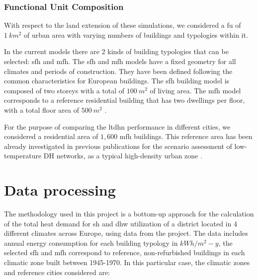 \documentclass{article}
\begin{document}
\subsubsection{Functional Unit Composition}

With respect to the land extension of these simulations, we considered a \gls{fu} of $1\ km^2$ of urban area with varying numbers of buildings and typologies within it. 

In the current models there are 2 kinds of building typologies that can be selected: \gls{sfh} and \gls{mfh}. The \gls{sfh} and \gls{mfh} models have a fixed geometry for all climates and periods of construction. They have been defined following the common characteristics for European buildings. The \gls{sfh} building model is composed of two storeys with a total of $100\ m^2$ of living area. The \gls{mfh} model corresponds to a reference residential building that has two dwellings per floor, with a total floor area of $500\ m^2$ \cite{dipasquale_chiara_2019_3256270}.

For the purpose of comparing the \gls{ltdhn} performance in different cities, we considered a residential area of $1,600$ \gls{mfh} buildings. This reference area has been already investigated in previous publications for the scenario assessment of low-temperature DH networks, as a typical high-density urban zone \cite{noauthor_home_nodate}.

\section{Data processing}
\label{sec:data-processing}


The methodology used in this project is a bottom-up approach for the calculation of the total heat demand for \gls{sh} and \gls{dhw} utilization of a district located in 4 different climates across Europe, using data from the \inspire project. The data includes annual energy consumption for each building typology in $kWh/m^2-y$, the selected \gls{sfh} and \gls{mfh} correspond to reference, non-refurbished buildings in each climatic zone built between 1945-1970. In this particular case, the climatic zones and reference cities considered are:
\end{document}

